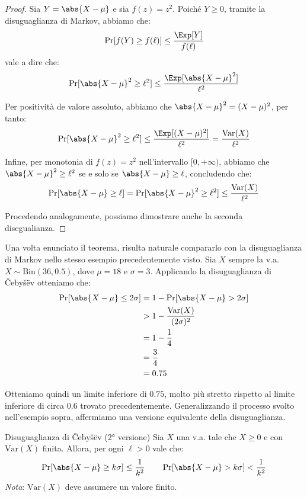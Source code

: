 \documentclass[a4paper, 12pt]{report}
\begin{document}
    \begin{proof}
        Sia $Y = \abs{X-\mu}$ e sia $f(z) = z^2$. Poiché $Y \geq 0$, tramite la disuguaglianza di Markov, abbiamo che:
        \[\Pr[f(Y) \geq f(\ell)] \leq \frac{\Exp[Y]}{f(\ell)}\]
        vale a dire che:
        \[\Pr[\abs{X-\mu}^2 \geq \ell^2] \leq \frac{\Exp[\abs{X-\mu}^2]}{\ell^2}\]

        Per positività de valore assoluto, abbiamo che $\abs{X-\mu}^2 = (X-\mu)^2$, per tanto:
        \[\Pr[\abs{X-\mu}^2 \geq \ell^2] \leq \frac{\Exp[(X-\mu)^2]}{\ell^2} = \frac{\mathrm{Var}(X)}{\ell^2}\]

        Infine, per monotonia di $f(z) = z^2$ nell'intervallo $[0, +\infty)$, abbiamo che $\abs{X-\mu}^2 \geq \ell^2$ se e solo se $\abs{X-\mu} \geq \ell$, concludendo che:
        \[\Pr[\abs{X-\mu} \geq \ell] = \Pr[\abs{X-\mu}^2 \geq \ell^2]  \leq \frac{\mathrm{Var}(X)}{\ell^2}\]

        Procedendo analogamente, possiamo dimostrare anche la seconda disegualianza.
    \end{proof}

    Una volta enunciato il teorema, risulta naturale compararlo con la disuguaglianza di Markov nello stesso esempio precedentemente visto. Sia $X$ sempre la v.a. $X \sim \mathrm{Bin}(36, 0.5)$, dove $\mu = 18$ e $\sigma = 3$. Applicando la disuguaglianza di Čebyšëv otteniamo che:
    \[\begin{split}
        \Pr[\abs{X-\mu} \leq 2\sigma] &= 1 - \Pr[\abs{X-\mu} > 2\sigma] \\
        &> 1 - \frac{\mathrm{Var}(X)}{(2\sigma)^2} \\
        &= 1 - \frac{1}{4} \\
        &= \frac{3}{4} \\
        &= 0.75
    \end{split}\]

    Otteniamo quindi un limite inferiore di $0.75$, molto più stretto rispetto al limite inferiore di circa $0.6$ trovato precedentemente. Generalizzando il processo svolto nell'esempio sopra, affermiamo una versione equivalente della disuguaglianza.

    \begin{framedcor}{Disuguaglianza di Čebyšëv (2° versione)}
        Sia $X$ una v.a. tale che $X \geq 0$ e con $\mathrm{Var}(X)$ finita. Allora, per ogni $\ell > 0$ vale che:
        \[\Pr[\abs{X-\mu} \geq k\sigma] \leq \frac{1}{k^2} \qquad \Pr[\abs{X-\mu} > k\sigma] < \frac{1}{k^2}\]
        \textit{Nota}: $\mathrm{Var}(X)$ deve assumere un valore finito. 
    \end{framedcor}
\end{document}
